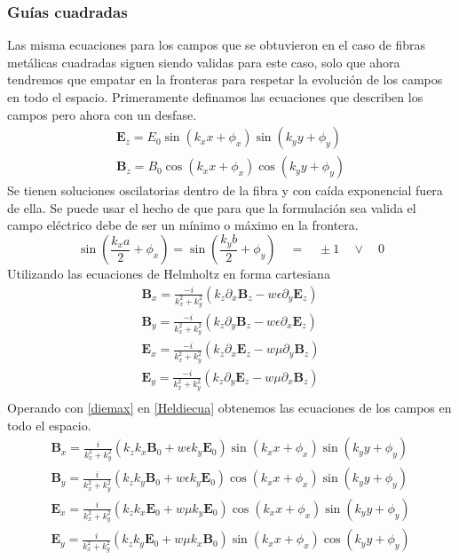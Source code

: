 \subsubsection{Guías cuadradas}
Las misma ecuaciones para los campos que se obtuvieron en el caso de fibras metálicas cuadradas siguen siendo validas para este caso, solo que ahora tendremos que empatar en la fronteras para respetar la evolución de los campos en todo el espacio. Primeramente definamos las ecuaciones que describen los campos pero ahora con un desfase.
\begin{eqnarray}\label{diemax}
\mathbf{E}_{z}=E_{0} \sin(k_{x}x+\phi_{x}) \sin(k_{y}y+\phi_{y}) \\
\mathbf{B}_{z}=B_{0} \cos(k_{x}x+\phi_{x}) \cos(k_{y}y+\phi_{y}) 
\end{eqnarray}
Se tienen soluciones oscilatorias dentro de la fibra y con caída exponencial fuera de ella. Se puede usar el hecho de que para que la formulación sea valida el campo eléctrico debe de ser un mínimo o máximo en la frontera.
\begin{equation}
	\sin(\frac{k_{x}a}{2}+\phi_{x})=\sin(\frac{k_{y}b}{2}+\phi_{y}) \quad = \quad \pm 1 \quad \vee \quad 0
\end{equation}
Utilizando las ecuaciones de Helmholtz en forma cartesiana
\begin{eqnarray} \label{Heldiecua}
\textbf{B}_{x}=\frac{-i}{k_{x}^2+k_{y}^2}(k_{z}\partial_{x}\textbf{B}_{z}-w \epsilon \partial_{y}\textbf{E}_{z}) \\
\textbf{B}_{y}=\frac{-i}{k_{x}^2+k_{y}^2}(k_{z}\partial_{y}\textbf{B}_{z}-w \epsilon \partial_{x}\textbf{E}_{z}) \\
\textbf{E}_{x}=\frac{-i}{k_{x}^2+k_{y}^2}(k_{z}\partial_{x}\textbf{E}_{z}-w \mu \partial_{y}\textbf{B}_{z}) \\
\textbf{E}_{y}=\frac{-i}{k_{x}^2+k_{y}^2}(k_{z}\partial_{y}\textbf{E}_{z}-w \mu \partial_{x}\textbf{B}_{z}) \\
\end{eqnarray}
Operando con \ref{diemax} en \ref{Heldiecua} obtenemos las ecuaciones de los campos en todo el espacio.
\begin{eqnarray}
\textbf{B}_{x}=\frac{i}{k_{x}^2+k_{y}^2}(k_{z}k_{x}\textbf{B}_{0}+w\epsilon k_{y}\textbf{E}_{0})\sin(k_{x}x+\phi_{x})\sin(k_{y}y+\phi_{y})\\
\textbf{B}_{y}=\frac{i}{k_{x}^2+k_{y}^2}(k_{z}k_{y}\textbf{B}_{0}+w\epsilon k_{y}\textbf{E}_{0})\cos(k_{x}x+\phi_{x})\sin(k_{y}y+\phi_{y})\\
\textbf{E}_{x}=\frac{i}{k_{x}^2+k_{y}^2}(k_{z}k_{x}\textbf{E}_{0}+w\mu k_{y}\textbf{E}_{0})\cos(k_{x}x+\phi_{x})\sin(k_{y}y+\phi_{y})\\
\textbf{E}_{y}=\frac{i}{k_{x}^2+k_{y}^2}(k_{z}k_{y}\textbf{E}_{0}+w\mu k_{x}\textbf{B}_{0})\sin(k_{x}x+\phi_{x})\cos(k_{y}y+\phi_{y})\\
\end{eqnarray}
